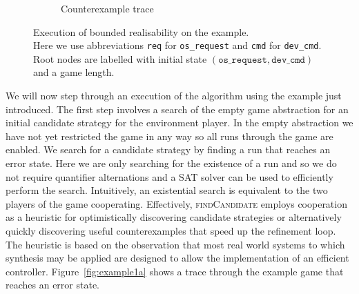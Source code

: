\begin{figure}
\begin{subfigure}[t]{0.3\textwidth}
\begin{minipage}[t][3.9cm][t]{\textwidth}
        \end{minipage}
        \caption{Counterexample trace}
        \label{fig:example1c}
    \end{subfigure}
    \captionsetup{justification=centering}
    \caption[Execution of bounded realisability on the example.]{Execution of bounded realisability on the example.\\Here we use abbreviations \texttt{req} for \texttt{os\_request} and \texttt{cmd} for \texttt{dev\_cmd}.\\Root nodes are labelled with initial state $(\texttt{os\_request}, \texttt{dev\_cmd})$ and a game length.}
    \label{fig:example1exe}
\end{figure}

We will now step through an execution of the algorithm using the example just introduced. The first step involves a search of the empty game abstraction for an initial candidate strategy for the environment player. In the empty abstraction we have not yet restricted the game in any way so all runs through the game are enabled. We search for a candidate strategy by finding a run that reaches an error state. Here we are only searching for the existence of a run and so we do not require quantifier alternations and a SAT solver can be used to efficiently perform the search. Intuitively, an existential search is equivalent to the two players of the game cooperating.  Effectively, \textsc{findCandidate} employs cooperation as a heuristic for optimistically discovering candidate strategies or alternatively quickly discovering useful counterexamples that speed up the refinement loop. The heuristic is based on the observation that most real world systems to which synthesis may be applied are designed to allow the implementation of an efficient controller.  Figure~\ref{fig:example1a} shows a trace through the example game that reaches an error state.

